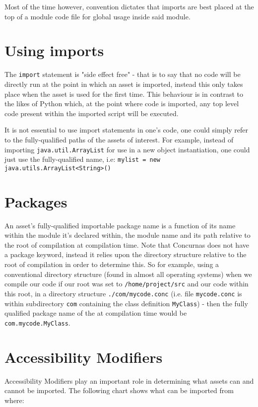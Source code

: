 \documentclass[conc-doc]{subfiles}
\begin{document}
Most of the time however, convention dictates that imports are best placed at the top of a module code file for global usage inside said module.

\section{Using imports}
The \lstinline{import} statement is "side effect free" - that is to say that no code will be directly run at the point in which an asset is imported, instead this only takes place when the asset is used for the first time. This behaviour is in contrast to the likes of Python which, at the point where code is imported, any top level code present within the imported script will be executed.

It is not essential to use import statements in one's code, one could simply refer to the fully-qualified paths of the assets of interest. For example, instead of importing \lstinline{java.util.ArrayList} for use in a new object instantiation, one could just use the fully-qualified name, i.e: \lstinline{mylist = new java.utils.ArrayList<String>()}

\section{Packages}
An asset's fully-qualified importable package name is a function of its name within the module it's declared within, the module name and its path relative to the root of compilation at compilation time. Note that Concurnas does not have a package keyword, instead it relies upon the directory structure relative to the root of compilation in order to determine this. So for example, using a conventional directory structure (found in almost all operating systems) when we compile our code if our root was set to \lstinline{/home/project/src} and our code within this root, in a directory structure \lstinline{./com/mycode.conc} (i.e. file \lstinline{mycode.conc} is within subdirectory \lstinline{com} containing the class definition \lstinline{MyClass}) - then the fully qualified package name of the at compilation time would be \lstinline{com.mycode.MyClass}.

\section{Accessibility Modifiers}
Accessibility Modifiers play an important role in determining what assets can and cannot be imported. The following chart shows what can be imported from where:
\end{document}
